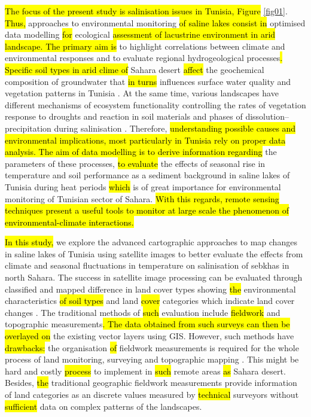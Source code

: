 \documentclass[land,article,submit,pdftex,moreauthors]{Definitions/mdpi}
\begin{document}
\hl{The focus of the present study is salinisation issues in Tunisia, Figure} \ref{fig01}. \hl{Thus,} approaches to environmental monitoring \hl{of saline lakes consist in} optimised data modelling \hl{for} ecological \hl{assessment of lacustrine environment in arid landscape. The primary aim is} to highlight correlations between climate and environmental responses \cite{BESSER2021104134} and to evaluate regional hydrogeological processes\hl{. Specific soil types in arid clime of} Sahara desert \hl{affect} the geochemical composition of groundwater that \hl{in turns }influences surface water quality and vegetation patterns in Tunisia \cite{HAMDI2021102974,RAFAATRIGUI2021104121}. At the same time, various landscapes have different mechanisms of ecosystem functionality controlling the rates of vegetation response to droughts and reaction in soil materials and phases of dissolution–precipitation during salinisation \cite{NAVARROTORRE2023105397}. Therefore, \hl{understanding possible causes and environmental implications, most particularly in Tunisia rely on proper data analysis. The aim of data modelling is to derive information regarding }the parameters of these processes, \hl{to evaluate }the effects of seasonal rise in temperature and soil performance as a sediment background in saline lakes of Tunisia during heat periods \hl{which }is of great importance for environmental monitoring of Tunisian sector of Sahara. \hl{With this regards, remote sensing techniques present a useful tools to monitor at large scale the phenomenon of environmental-climate interactions.}

\hl{In this study,} we explore the advanced cartographic approaches to map changes in saline lakes of Tunisia using satellite images to better evaluate the effects from climate and seasonal fluctuations in temperature on salinisation of sebkhas in north Sahara. The success in satellite image processing can be evaluated through classified and mapped difference in land cover types showing \hl{the }environmental characteristics \hl{of soil types} and land \hl{cover }categories which indicate land cover changes \cite{Shoshany}. The traditional methods of \hl{such }evaluation include \hl{fieldwork} and topographic measurements\hl{. The data obtained from such surveys can then be overlayed on} the existing vector layers using GIS. However, such methods have\hl{ drawbacks: }the organisation \hl{of} fieldwork measurements is required for the whole process of land monitoring, surveying and topographic mapping \cite{JENDOUBI2020100507}. This might be hard and costly \hl{process }to implement in \hl{such} remote areas \hl{as} Sahara desert. Besides, \hl{the }traditional geographic fieldwork measurements provide information of land categories as an discrete values measured by  \hl{technical} surveyors without \hl{sufficient }data on complex patterns of the landscapes. 
\end{document}
